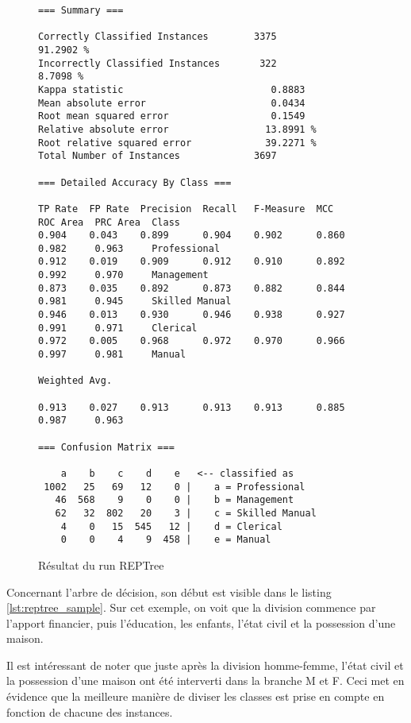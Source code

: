 \begin{figure}[H]
\centering
\begin{lstlisting}	
=== Summary ===

Correctly Classified Instances        3375               91.2902 %
Incorrectly Classified Instances       322                8.7098 %
Kappa statistic                          0.8883
Mean absolute error                      0.0434
Root mean squared error                  0.1549
Relative absolute error                 13.8991 %
Root relative squared error             39.2271 %
Total Number of Instances             3697     

=== Detailed Accuracy By Class ===

TP Rate  FP Rate  Precision  Recall   F-Measure  MCC      ROC Area  PRC Area  Class
0.904    0.043    0.899      0.904    0.902      0.860    0.982     0.963     Professional
0.912    0.019    0.909      0.912    0.910      0.892    0.992     0.970     Management
0.873    0.035    0.892      0.873    0.882      0.844    0.981     0.945     Skilled Manual
0.946    0.013    0.930      0.946    0.938      0.927    0.991     0.971     Clerical
0.972    0.005    0.968      0.972    0.970      0.966    0.997     0.981     Manual

Weighted Avg.    

0.913    0.027    0.913      0.913    0.913      0.885    0.987     0.963     

=== Confusion Matrix ===

    a    b    c    d    e   <-- classified as
 1002   25   69   12    0 |    a = Professional
   46  568    9    0    0 |    b = Management
   62   32  802   20    3 |    c = Skilled Manual
    4    0   15  545   12 |    d = Clerical
    0    0    4    9  458 |    e = Manual
\end{lstlisting}
\caption{Résultat du run REPTree}
\label{lst:reptree_res}
\end{figure}

Concernant l'arbre de décision, son début est visible dans le listing \autoref{lst:reptree_sample}. Sur cet exemple, on voit que la division commence par l'apport financier, puis l'éducation, les enfants, l'état civil et la possession d'une maison. 

Il est intéressant de noter que juste après la division homme-femme, l'état civil et la possession d'une maison ont été interverti dans la branche M et F. Ceci met en évidence que la meilleure manière de diviser les classes est prise en compte en fonction de chacune des instances.

